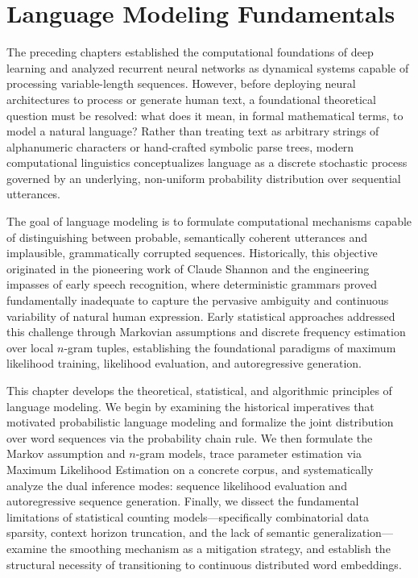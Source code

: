 \documentclass[../../../main.tex]{subfiles}
\begin{document}
\chapter{Language Modeling Fundamentals}
\label{ch:language_models}
\label{ch:language_models_intro}

The preceding chapters established the computational foundations of deep learning and analyzed recurrent neural networks as dynamical systems capable of processing variable-length sequences. However, before deploying neural architectures to process or generate human text, a foundational theoretical question must be resolved: what does it mean, in formal mathematical terms, to model a natural language? Rather than treating text as arbitrary strings of alphanumeric characters or hand-crafted symbolic parse trees, modern computational linguistics conceptualizes language as a discrete stochastic process governed by an underlying, non-uniform probability distribution over sequential utterances.

The goal of language modeling is to formulate computational mechanisms capable of distinguishing between probable, semantically coherent utterances and implausible, grammatically corrupted sequences. Historically, this objective originated in the pioneering work of Claude Shannon and the engineering impasses of early speech recognition, where deterministic grammars proved fundamentally inadequate to capture the pervasive ambiguity and continuous variability of natural human expression. Early statistical approaches addressed this challenge through Markovian assumptions and discrete frequency estimation over local $n$-gram tuples, establishing the foundational paradigms of maximum likelihood training, likelihood evaluation, and autoregressive generation.

This chapter develops the theoretical, statistical, and algorithmic principles of language modeling. We begin by examining the historical imperatives that motivated probabilistic language modeling and formalize the joint distribution over word sequences via the probability chain rule. We then formulate the Markov assumption and $n$-gram models, trace parameter estimation via Maximum Likelihood Estimation on a concrete corpus, and systematically analyze the dual inference modes: sequence likelihood evaluation and autoregressive sequence generation. Finally, we dissect the fundamental limitations of statistical counting models---specifically combinatorial data sparsity, context horizon truncation, and the lack of semantic generalization---examine the smoothing mechanism as a mitigation strategy, and establish the structural necessity of transitioning to continuous distributed word embeddings.
\end{document}
